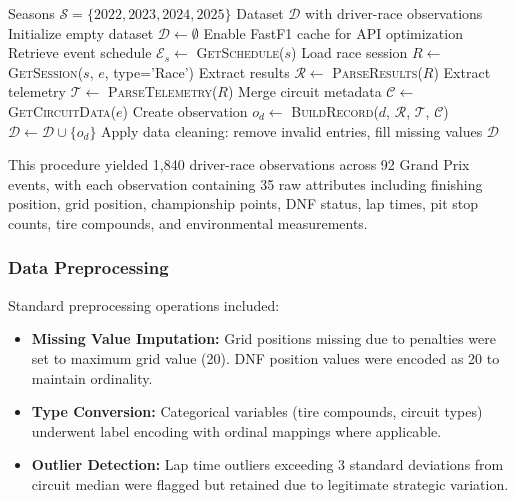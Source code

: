 \documentclass[conference]{IEEEtran}
\begin{document}
\begin{algorithm}
\caption{Historical Race Data Extraction}
\label{alg:data_collection}
\begin{algorithmic}[1]
\REQUIRE Seasons $\mathcal{S} = \{2022, 2023, 2024, 2025\}$
\ENSURE Dataset $\mathcal{D}$ with driver-race observations
\STATE Initialize empty dataset $\mathcal{D} \leftarrow \emptyset$
\STATE Enable FastF1 cache for API optimization
    \STATE Retrieve event schedule $\mathcal{E}_s \leftarrow$ \textsc{GetSchedule}($s$)
        \STATE Load race session $R \leftarrow$ \textsc{GetSession}($s$, $e$, type='Race')
            \STATE Extract results $\mathcal{R} \leftarrow$ \textsc{ParseResults}($R$)
            \STATE Extract telemetry $\mathcal{T} \leftarrow$ \textsc{ParseTelemetry}($R$)
            \STATE Merge circuit metadata $\mathcal{C} \leftarrow$ \textsc{GetCircuitData}($e$)
                \STATE Create observation $o_d \leftarrow$ \textsc{BuildRecord}($d$, $\mathcal{R}$, $\mathcal{T}$, $\mathcal{C}$)
                \STATE $\mathcal{D} \leftarrow \mathcal{D} \cup \{o_d\}$
            \ENDFOR
        \ENDIF
    \ENDFOR
\ENDFOR
\STATE Apply data cleaning: remove invalid entries, fill missing values
\RETURN $\mathcal{D}$
\end{algorithmic}
\end{algorithm}

This procedure yielded 1,840 driver-race observations across 92 Grand Prix events, with each observation containing 35 raw attributes including finishing position, grid position, championship points, DNF status, lap times, pit stop counts, tire compounds, and environmental measurements.

\subsubsection{Data Preprocessing}

Standard preprocessing operations included:
\begin{itemize}
    \item \textbf{Missing Value Imputation:} Grid positions missing due to penalties were set to maximum grid value (20). DNF position values were encoded as 20 to maintain ordinality.
    \item \textbf{Type Conversion:} Categorical variables (tire compounds, circuit types) underwent label encoding with ordinal mappings where applicable.
    \item \textbf{Outlier Detection:} Lap time outliers exceeding 3 standard deviations from circuit median were flagged but retained due to legitimate strategic variation.
\end{itemize}
\end{document}
